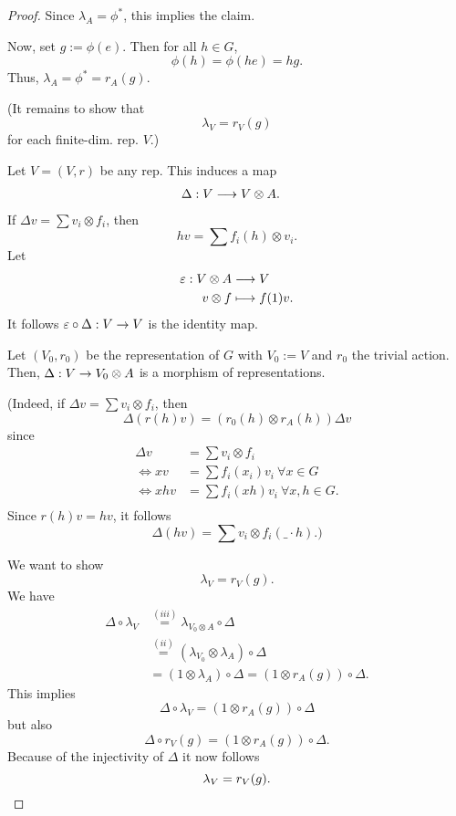 \begin{proof}
	Since $\lambda_A = \phi^*$, this implies the claim.
	
	Now, set $g := \phi(e)$. Then for all $h \in G$,
	\[ \phi(h) = \phi(he) = hg. \]
	Thus, $\lambda_A = \phi^* = r_A(g)$.
	
	(It remains to show that
	\[ \lambda_V = r_V(g) \]
	for each finite-dim. rep. $V$.)
	
	Let $V = (V,r)$ be any rep. This induces a map
	\begin{align*}
\Delta: V & \overset{}{\longrightarrow}V\otimes  A.
\end{align*}
If $\Delta v = \sum{v_i} \otimes f_i$, then
\[ hv = \sum f_i(h) \otimes v_i.  \]
Let \begin{align*}
\varepsilon : V\otimes A & \overset{}{\longrightarrow} V\\
v\otimes f &\longmapsto f(1) v.
\end{align*}
It follows $\varepsilon \circ \Delta : V \overset{}{\rightarrow} V$ is the identity map.


Let $(V_0, r_0)$ be the representation of $G$ with $V_0 := V$ and $r_0$ the trivial action.
Then, $\Delta : V \overset{}{\rightarrow} V_0\otimes A$ is a morphism of representations.

(Indeed, if $\Delta v = \sum v_i \otimes f_i$, then 
\[ \Delta (r(h) v) \overset{}{=} (r_0(h) \otimes r_A(h) ) \Delta v \]
since
\begin{align*}
\Delta v &= \sum v_i \otimes f_i\\
\iff xv &= \sum f_i(x_i)v_i ~ \forall x \in G\\
\iff xhv &= \sum f_i(xh) v_i ~\forall x,h \in G.\\
\end{align*}
Since $r(h) v = hv$, it follows
\[ \Delta(hv) = \sum v_i \otimes f_i(\_\cdot h).) \]


We want to show
\[ \lambda_V = r_V(g). \]
We have
\begin{align*}
\Delta \circ \lambda_V &\overset{(iii)}{=} \lambda_{V_0 \otimes A} \circ \Delta\\
&\overset{(ii)}{=} (\lambda_{V_0} \otimes \lambda_A)\circ \Delta\\
&= (1 \otimes  \lambda_A)\circ \Delta =( 1 \otimes r_A(g))\circ \Delta.
\end{align*}
This implies
\[ \Delta \circ \lambda_V = (1 \otimes r_A(g)) \circ \Delta \]
but also
\[ \Delta \circ r_V(g) = (1 \otimes r_A(g)) \circ \Delta. \]
Because of the injectivity of $\Delta$ it now follows
\[ \lambda_V = r_V(g).\qedhere \]
\end{proof}

